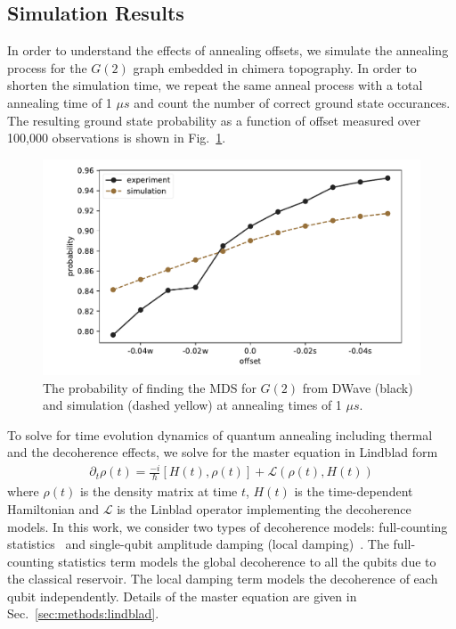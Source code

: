 \documentclass[prd,twocolumn,tightenlines,preprintnumbers,showpacs,superscriptaddress,notitlepage,nofootinbib,eqsecnum,floatfix,longbibliography,aps,10pt]{revtex4-2}
\begin{document}
\subsection{Simulation Results}
\label{sec:results:simulation}
In order to understand the effects of annealing offsets, we simulate the annealing process for the $G(2)$ graph embedded in chimera topography.
In order to shorten the simulation time, we repeat the same anneal process with a total annealing time of 1 $\mu s$ and count the number of correct ground state occurances.
The resulting ground state probability as a function of offset measured over 100,000 observations is shown in Fig.~\ref{fig:dwave1us}.

\begin{figure}[b]
	\centering
	\includegraphics[width=\columnwidth]{./new_figures/NN2_offset_scaling.pdf}
	\caption{The probability of finding the MDS for $G(2)$ from DWave (black) and simulation (dashed yellow) at annealing times of 1 $\mu s$.}
	\label{fig:dwave1us}
\end{figure}


To solve for time evolution dynamics of quantum annealing including thermal and the decoherence effects, we solve for the master equation in Lindblad form
\begin{align}
 \partial_t \rho (t) =  \frac{-i}{\hbar} [H(t) , \rho(t)] + \mathcal{L}(\rho(t), H(t))
\end{align}
where $\rho (t)$ is the density matrix at time $t$, $H(t)$ is the time-dependent Hamiltonian and $\mathcal{L}$ is the Linblad operator implementing the decoherence models.
In this work, we consider two types of decoherence models: full-counting statistics~\cite{PhysRevE.90.022103} and single-qubit amplitude damping (local damping)~\cite{10.5555/1972505}.
The full-counting statistics term models the global decoherence to all the qubits due to the classical reservoir.
The local damping term models the decoherence of each qubit independently.
Details of the master equation are given in Sec.~\ref{sec:methods:lindblad}.
\end{document}
